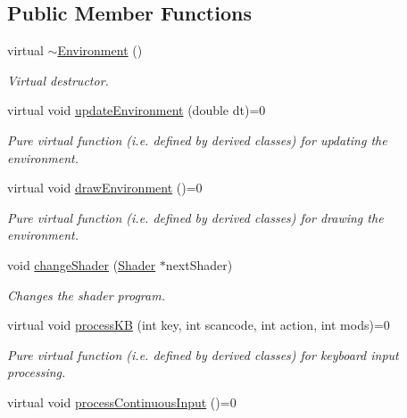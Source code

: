 \subsection*{Public Member Functions}
\begin{DoxyCompactItemize}
\item 
virtual \hyperlink{class_environment_aefe8af88acfb7dc03cea3bbff73888a5}{$\sim$\+Environment} ()\hypertarget{class_environment_aefe8af88acfb7dc03cea3bbff73888a5}{}\label{class_environment_aefe8af88acfb7dc03cea3bbff73888a5}

\begin{DoxyCompactList}\small\item\em Virtual destructor. \end{DoxyCompactList}\item 
virtual void \hyperlink{class_environment_afbc95329581e994ed49a678c814657ea}{update\+Environment} (double dt)=0
\begin{DoxyCompactList}\small\item\em Pure virtual function (i.\+e. defined by derived classes) for updating the environment. \end{DoxyCompactList}\item 
virtual void \hyperlink{class_environment_abcb85d008742da90125199da254c2c02}{draw\+Environment} ()=0\hypertarget{class_environment_abcb85d008742da90125199da254c2c02}{}\label{class_environment_abcb85d008742da90125199da254c2c02}

\begin{DoxyCompactList}\small\item\em Pure virtual function (i.\+e. defined by derived classes) for drawing the environment. \end{DoxyCompactList}\item 
void \hyperlink{class_environment_ac3b35b4c49e51075063e4dbed67845fb}{change\+Shader} (\hyperlink{class_shader}{Shader} $\ast$next\+Shader)
\begin{DoxyCompactList}\small\item\em Changes the shader program. \end{DoxyCompactList}\item 
virtual void \hyperlink{class_environment_a3a105533fb7592615f6b4321aafc5545}{process\+KB} (int key, int scancode, int action, int mods)=0
\begin{DoxyCompactList}\small\item\em Pure virtual function (i.\+e. defined by derived classes) for keyboard input processing. \end{DoxyCompactList}\item 
virtual void \hyperlink{class_environment_ac8157c702f012ecbdf42fc868d5164a8}{process\+Continuous\+Input} ()=0\hypertarget{class_environment_ac8157c702f012ecbdf42fc868d5164a8}{}\label{class_environment_ac8157c702f012ecbdf42fc868d5164a8}


\end{DoxyCompactItemize}
